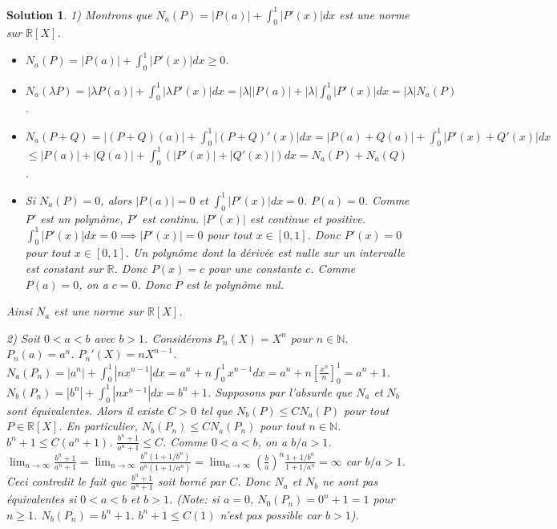 \documentclass{article}
\newtheorem{solution}{Solution}
\begin{document}
\begin{solution}
1) Montrons que $N_a(P) = |P(a)| + \int_0^1 |P'(x)| dx$ est une norme sur $\mathbb{R}[X]$.
\begin{itemize}
    \item $N_a(P) = |P(a)| + \int_0^1 |P'(x)| dx \ge 0$.
    \item $N_a(\lambda P) = |\lambda P(a)| + \int_0^1 |\lambda P'(x)| dx = |\lambda| |P(a)| + |\lambda| \int_0^1 |P'(x)| dx = |\lambda| N_a(P)$.
    \item $N_a(P+Q) = |(P+Q)(a)| + \int_0^1 |(P+Q)'(x)| dx = |P(a)+Q(a)| + \int_0^1 |P'(x)+Q'(x)| dx$
    $\le |P(a)|+|Q(a)| + \int_0^1 (|P'(x)|+|Q'(x)|) dx = N_a(P) + N_a(Q)$.
    \item Si $N_a(P) = 0$, alors $|P(a)|=0$ et $\int_0^1 |P'(x)| dx = 0$.
    $P(a)=0$. Comme $P'$ est un polynôme, $P'$ est continu. $|P'(x)|$ est continue et positive.
    $\int_0^1 |P'(x)| dx = 0 \implies |P'(x)| = 0$ pour tout $x \in [0,1]$.
    Donc $P'(x)=0$ pour tout $x \in [0,1]$.
    Un polynôme dont la dérivée est nulle sur un intervalle est constant sur $\mathbb{R}$.
    Donc $P(x) = c$ pour une constante $c$.
    Comme $P(a)=0$, on a $c=0$. Donc $P$ est le polynôme nul.
\end{itemize}
Ainsi $N_a$ est une norme sur $\mathbb{R}[X]$.

2) Soit $0 < a < b$ avec $b > 1$. Considérons $P_n(X) = X^n$ pour $n \in \mathbb{N}$.
$P_n(a) = a^n$. $P_n'(X) = nX^{n-1}$.
$N_a(P_n) = |a^n| + \int_0^1 |n x^{n-1}| dx = a^n + n \int_0^1 x^{n-1} dx = a^n + n [\frac{x^n}{n}]_0^1 = a^n + 1$.
$N_b(P_n) = |b^n| + \int_0^1 |n x^{n-1}| dx = b^n + 1$.
Supposons par l'absurde que $N_a$ et $N_b$ sont équivalentes.
Alors il existe $C > 0$ tel que $N_b(P) \le C N_a(P)$ pour tout $P \in \mathbb{R}[X]$.
En particulier, $N_b(P_n) \le C N_a(P_n)$ pour tout $n \in \mathbb{N}$.
$b^n + 1 \le C (a^n + 1)$.
$\frac{b^n+1}{a^n+1} \le C$.
Comme $0 < a < b$, on a $b/a > 1$.
$\lim_{n \to \infty} \frac{b^n+1}{a^n+1} = \lim_{n \to \infty} \frac{b^n(1+1/b^n)}{a^n(1+1/a^n)} = \lim_{n \to \infty} (\frac{b}{a})^n \frac{1+1/b^n}{1+1/a^n} = \infty$ car $b/a > 1$.
Ceci contredit le fait que $\frac{b^n+1}{a^n+1}$ soit borné par $C$.
Donc $N_a$ et $N_b$ ne sont pas équivalentes si $0 < a < b$ et $b>1$.
(Note: si $a=0$, $N_0(P_n) = 0^n + 1 = 1$ pour $n \ge 1$. $N_b(P_n) = b^n+1$. $b^n+1 \le C (1)$ n'est pas possible car $b>1$).


\end{solution}
\end{document}
